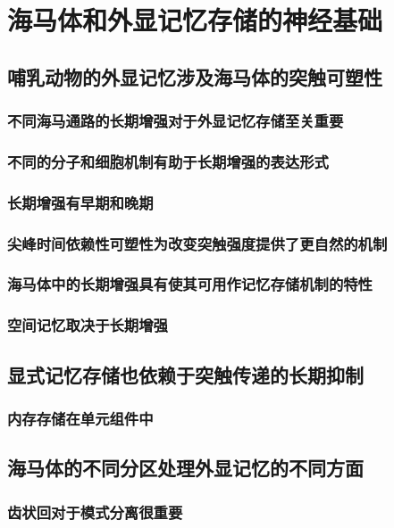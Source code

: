 \chapter{海马体和外显记忆存储的神经基础}


\section{哺乳动物的外显记忆涉及海马体的突触可塑性}
\subsection{不同海马通路的长期增强对于外显记忆存储至关重要}
\subsection{不同的分子和细胞机制有助于长期增强的表达形式}
\subsection{长期增强有早期和晚期}
\subsection{尖峰时间依赖性可塑性为改变突触强度提供了更自然的机制}
\subsection{海马体中的长期增强具有使其可用作记忆存储机制的特性}
\subsection{空间记忆取决于长期增强}

\section{显式记忆存储也依赖于突触传递的长期抑制}
\subsection{内存存储在单元组件中}

\section{海马体的不同分区处理外显记忆的不同方面}
\subsection{齿状回对于模式分离很重要}
